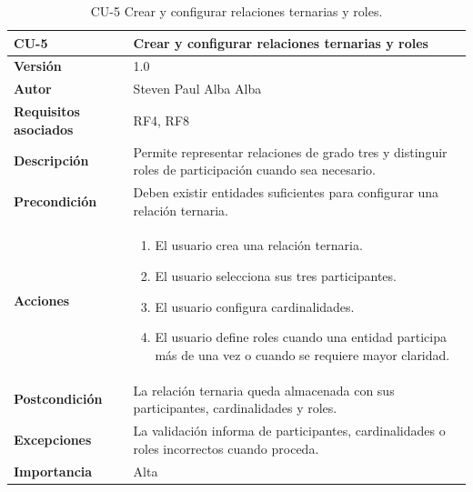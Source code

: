 \begin{table}[p]
\centering
\begin{tabularx}{\linewidth}{ p{} p{} }
\toprule
\textbf{CU-5} & \textbf{Crear y configurar relaciones ternarias y roles}\\
\toprule
\textbf{Versión} & 1.0 \\
\textbf{Autor} & Steven Paul Alba Alba \\
\textbf{Requisitos asociados} & RF4, RF8 \\
\textbf{Descripción} & Permite representar relaciones de grado tres y distinguir roles de participación cuando sea necesario. \\
\textbf{Precondición} & Deben existir entidades suficientes para configurar una relación ternaria. \\
\textbf{Acciones} &
\begin{enumerate}
\def\labelenumi{\arabic{enumi}.}
\tightlist
\item El usuario crea una relación ternaria.
\item El usuario selecciona sus tres participantes.
\item El usuario configura cardinalidades.
\item El usuario define roles cuando una entidad participa más de una vez o cuando se requiere mayor claridad.
\end{enumerate}\\
\textbf{Postcondición} & La relación ternaria queda almacenada con sus participantes, cardinalidades y roles. \\
\textbf{Excepciones} & La validación informa de participantes, cardinalidades o roles incorrectos cuando proceda. \\
\textbf{Importancia} & Alta \\
\bottomrule
\end{tabularx}
\caption{CU-5 Crear y configurar relaciones ternarias y roles.}
\end{table}

